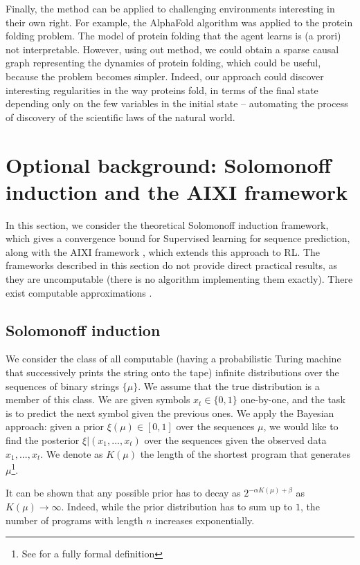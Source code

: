 \documentclass[a4paper,11pt,oneside]{report}
\begin{document}
Finally, the method can be applied to challenging environments interesting in their own right. For example, the AlphaFold \cite{alquraishi2019alphafold} algorithm was applied to the protein folding problem. The model of protein folding that the agent learns is (a prori) not interpretable. However, using out method, we could obtain a sparse causal graph representing the dynamics of protein folding, which could be useful, because the problem becomes simpler. Indeed, our approach could discover interesting regularities in the way proteins fold, in terms of the final state depending only on the few variables in the initial state -- automating the process of discovery of the scientific laws of the natural world.

\appendix
\chapter{Optional background: Solomonoff induction and the AIXI framework}
\label{ch:solomonoff_aixi}
In this section, we consider the theoretical Solomonoff induction framework, which gives a convergence bound for Supervised learning for sequence prediction, along with the AIXI framework \cite{Hutter2003,legg2008machine}, which extends this approach to RL. The frameworks described in this section do not provide direct practical results, as they are uncomputable \cite{Hutter2003} (there is no algorithm implementing them exactly). There exist computable approximations \cite{Veness2010}.

\section{Solomonoff induction}
\label{subsec:solomonoff}
We consider the class of all computable (having a probabilistic Turing machine that successively prints the string onto the tape) infinite distributions over the sequences of binary strings $\{\mu\}$. We assume that the true distribution is a member of this class. We are given symbols $x_t\in \{0,1\}$ one-by-one, and the task is to predict the next symbol given the previous ones. We apply the Bayesian approach: given a prior $\xi(\mu)\in[0,1]$ over the sequences $\mu$, we would like to find the posterior $\xi|(x_1,...,x_t)$ over the sequences given the observed data $x_1,...,x_t$. We denote as $K(\mu)$ the length of the shortest program that generates $\mu$\footnote{See \cite{Hutter2003} for a fully formal definition}.

It can be shown \cite{Hoang2020,Citation2021} that any possible prior has to decay as $2^{-\alpha K(\mu)+\beta}$ as $K(\mu)\to\infty$. Indeed, while the prior distribution has to sum up to $1$, the number of programs with length $n$ increases exponentially.
\end{document}
